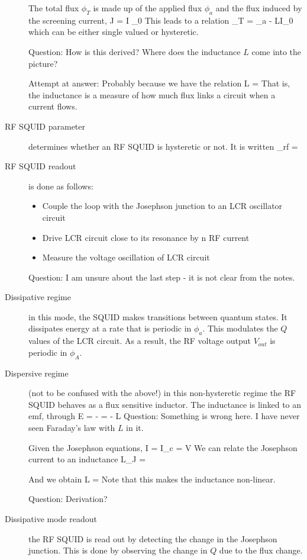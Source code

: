 \begin{description}
The total flux $\phi_T$ is made up of the applied flux $\phi_a$ and the flux induced by the screening current, 
\beq
J = I _0 \sin{\delta}
\eeq
This leads to a relation
\beq
\phi_T = \phi_a - LI_0 
\eeq
which can be either single valued or hysteretic. 

Question: How is this derived? Where does the inductance $L$ come into the picture? 

Attempt at answer: Probably because we have the relation
\beq
L = 
\eeq
That is, the inductance is a measure of how much flux links a circuit when a current flows. 

\item[RF SQUID parameter] determines whether an RF SQUID is hysteretic or not. It is written
\beq
\beta_{rf} =  
\eeq


\item[RF SQUID readout] is done as follows:
\begin{itemize}
\item Couple the loop with the Josephson junction to an LCR oscillator circuit 
\item Drive LCR circuit close to its resonance by n RF current
\item Measure the voltage oscillation of LCR circuit 
\end{itemize}

Question: I am unsure about the last step - it is not clear from the notes. 

\item[Dissipative regime] in this mode, the SQUID makes transitions between quantum states. It dissipates energy at a rate that is periodic in $\phi_a$. This modulates the $Q$ values of the LCR circuit. As a result, the RF voltage output $V_{out}$ is periodic in $\phi_A$. 



\item[Dispersive regime] (not to be confused with the above!) in this non-hysteretic regime the RF SQUID behaves as a flux sensitive inductor. The inductance is linked to an emf, through
\beq
E = -  = - L 
\eeq
Question: Something is wrong here. I have never seen Faraday's law with $L$ in it. 

Given the Josephson equations, 
\beq
I = I_c \sin{\phi}
\eeq
\beq
{} =  V
\eeq
We can relate the Josephson current to an inductance
\beq
L_J = 
\eeq

And we obtain
\beq
L = 
\eeq
Note that this makes the inductance non-linear. 

Question: Derivation? 

\item[Dissipative mode readout] the RF SQUID is read out by detecting the change in the Josephson junction. This is done by observing the change in $Q$ due to the flux change. 



\end{description}
\newpage

